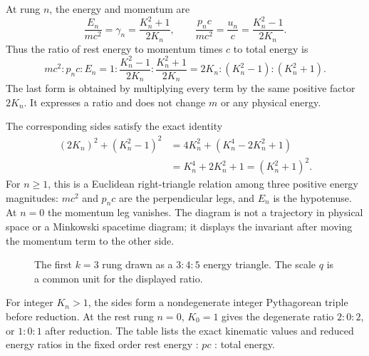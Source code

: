 \documentclass[12pt]{article}
\begin{document}
At rung $n$, the energy and momentum are
\begin{equation}
  \frac{E_n}{mc^2}=\gamma_n=\frac{K_n^2+1}{2K_n},
  \qquad
  \frac{p_nc}{mc^2}=\frac{u_n}{c}=\frac{K_n^2-1}{2K_n}.
  \label{eq:rung-energy-momentum}
\end{equation}
Thus the ratio of rest energy to momentum times $c$ to total energy is
\begin{equation}
  mc^2: p_nc : E_n
  =1:\frac{K_n^2-1}{2K_n}:\frac{K_n^2+1}{2K_n}
  =2K_n:(K_n^2-1):(K_n^2+1).
  \label{eq:triangle-ratio}
\end{equation}
The last form is obtained by multiplying every term by the same positive factor $2K_n$. It expresses a ratio and does not change $m$ or any physical energy.

The corresponding sides satisfy the exact identity
\begin{equation}
  \begin{aligned}
    (2K_n)^2+(K_n^2-1)^2
    &=4K_n^2+(K_n^4-2K_n^2+1) \\
    &=K_n^4+2K_n^2+1=(K_n^2+1)^2.
  \end{aligned}
  \label{eq:pythagorean-identity}
\end{equation}
For $n\geq1$, this is a Euclidean right-triangle relation among three positive energy magnitudes: $mc^2$ and $p_nc$ are the perpendicular legs, and $E_n$ is the hypotenuse. At $n=0$ the momentum leg vanishes. The diagram is not a trajectory in physical space or a Minkowski spacetime diagram; it displays the invariant after moving the momentum term to the other side.

\begin{figure}[ht]
  \centering
  \caption{The first $k=3$ rung drawn as a $3{:}4{:}5$ energy triangle. The scale $q$ is a common unit for the displayed ratio.}
  \label{fig:345-triangle}
\end{figure}

For integer $K_n>1$, the sides form a nondegenerate integer Pythagorean triple before reduction. At the rest rung $n=0$, $K_0=1$ gives the degenerate ratio $2:0:2$, or $1:0:1$ after reduction. The table lists the exact kinematic values and reduced energy ratios in the fixed order rest energy : $pc$ : total energy.
\end{document}
